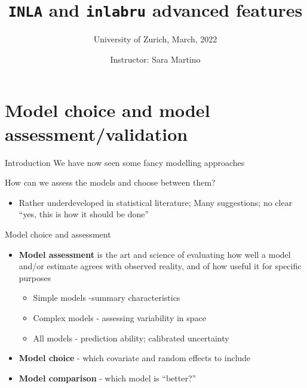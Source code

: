 \documentclass[
  ignorenonframetext,
]{beamer}
\title{\texttt{INLA} and \texttt{inlabru} advanced features}
\subtitle{University of Zurich, March, 2022}
\author{Instructor: Sara Martino}
\date{}
\institute{Department of Mathematical Science (NTNU)}
\providecommand{\tightlist}{%
  \setlength{\itemsep}{0pt}\setlength{\parskip}{0pt}}
\begin{document}
\frame{\titlepage}

\begin{frame}[allowframebreaks]
  \tableofcontents[hideallsubsections]
\end{frame}
\begin{frame}
\end{frame}

\hypertarget{model-choice-and-model-assessmentvalidation}{%
\section{Model choice and model
assessment/validation}\label{model-choice-and-model-assessmentvalidation}}

\begin{frame}{Introduction}
\protect\hypertarget{introduction}{}
We have now seen some fancy modelling approaches

How can we assess the models and choose between them?

\pause

\begin{itemize}
\tightlist
\item
  Rather underdeveloped in statistical literature; Many suggestions; no
  clear ``yes, this is how it should be done''
\end{itemize}
\end{frame}

\begin{frame}{Model choice and assessment}
\protect\hypertarget{model-choice-and-assessment}{}
\begin{itemize}
\item
  \textbf{Model assessment} is the art and science of evaluating how
  well a model and/or estimate agrees with observed reality, and of how
  useful it for specific purposes

  \begin{itemize}
  \tightlist
  \item
    Simple models -summary characteristics
  \item
    Complex models - assessing variability in space
  \item
    All models - prediction ability; calibrated uncertainty
  \end{itemize}
\item
  \textbf{Model choice} - which covariate and random effects to include
\item
  \textbf{Model comparison} - which model is ``better?''
\end{itemize}
\end{frame}
\end{document}
